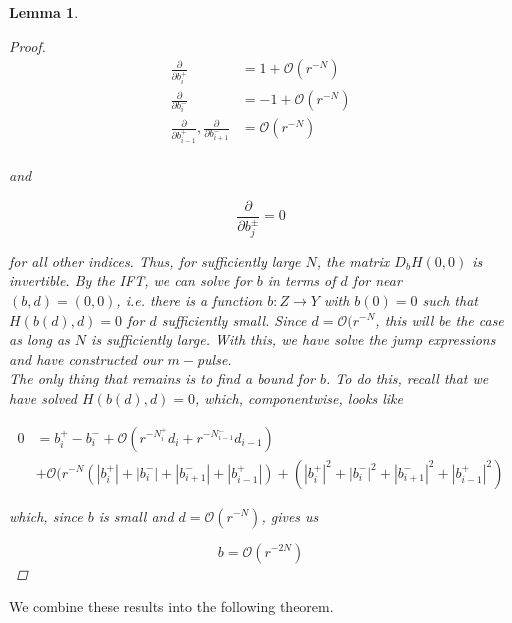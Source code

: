 \documentclass[12pt]{article}
\newtheorem{lemma}{Lemma}
\begin{document}
\begin{lemma}
\begin{proof}
\begin{align*}
\frac{\partial}{\partial b_i^+} &= 1 + \mathcal{O}(r^{-N})  \\
\frac{\partial}{\partial b_i^-} &= -1 + \mathcal{O}(r^{-N}) \\
\frac{\partial}{\partial b_{i-1}^+},
\frac{\partial}{\partial b_{i+1}^-} &= \mathcal{O}(r^{-N}) \\
\end{align*}

and 

\[
\frac{\partial}{\partial b_j^\pm} = 0
\]

for all other indices. Thus, for sufficiently large $N$, the matrix $D_b H(0,0)$ is invertible. By the IFT, we can solve for $b$ in terms of $d$ for near $(b,d) = (0, 0)$, i.e. there is a function $b: Z \rightarrow Y$ with $b(0) = 0$ such that $H(b(d),d) = 0$ for $d$ sufficiently small. Since $d = \mathcal{O}(r^{-N}$, this will be the case as long as $N$ is sufficiently large. With this, we have solve the jump expressions and have constructed our $m-$pulse.\\

The only thing that remains is to find a bound for $b$. To do this, recall that we have solved $H(b(d),d) = 0$, which, componentwise, looks like

\begin{align*}
0 &= b_i^+ - b_i^- + \mathcal{O}(r^{-N_i^+} d_i + r^{-N_{i-1}^-} d_{i-1}) \\
&+ \mathcal{O}( r^{-N}(|b_i^+| + |b_i^-| + |b_{i+1}^-| + |b_{i-1}^+|)
+ (|b_i^+|^2 + |b_i^-|^2 + |b_{i+1}^-|^2 + |b_{i-1}^+|^2)
\end{align*}

which, since $b$ is small and $d = \mathcal{O}(r^{-N})$, gives us

\[
b = \mathcal{O}(r^{-2N})
\]

\end{proof}
\end{lemma}

We combine these results into the following theorem.

\end{document}
